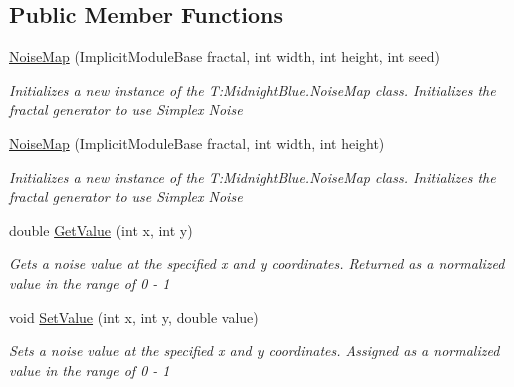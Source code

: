 \subsection*{Public Member Functions}
\begin{DoxyCompactItemize}
\item 
\hyperlink{class_midnight_blue_1_1_noise_map_af9e93d0f595baf7f0e7c371cbbaa1809}{Noise\+Map} (Implicit\+Module\+Base fractal, int width, int height, int seed)
\begin{DoxyCompactList}\small\item\em Initializes a new instance of the T\+:\+Midnight\+Blue.\+Noise\+Map class. Initializes the fractal generator to use Simplex Noise \end{DoxyCompactList}\item 
\hyperlink{class_midnight_blue_1_1_noise_map_ad4c66d8f106a0b2c7018a5875e470e14}{Noise\+Map} (Implicit\+Module\+Base fractal, int width, int height)
\begin{DoxyCompactList}\small\item\em Initializes a new instance of the T\+:\+Midnight\+Blue.\+Noise\+Map class. Initializes the fractal generator to use Simplex Noise \end{DoxyCompactList}\item 
double \hyperlink{class_midnight_blue_1_1_noise_map_a70d9e8d99e157143eb3d1dbc3895cb9a}{Get\+Value} (int x, int y)
\begin{DoxyCompactList}\small\item\em Gets a noise value at the specified x and y coordinates. Returned as a normalized value in the range of 0 -\/ 1 \end{DoxyCompactList}\item 
void \hyperlink{class_midnight_blue_1_1_noise_map_a26d94cbea4c0377833bed064cbd36496}{Set\+Value} (int x, int y, double value)
\begin{DoxyCompactList}\small\item\em Sets a noise value at the specified x and y coordinates. Assigned as a normalized value in the range of 0 -\/ 1 \end{DoxyCompactList}\end{DoxyCompactItemize}
